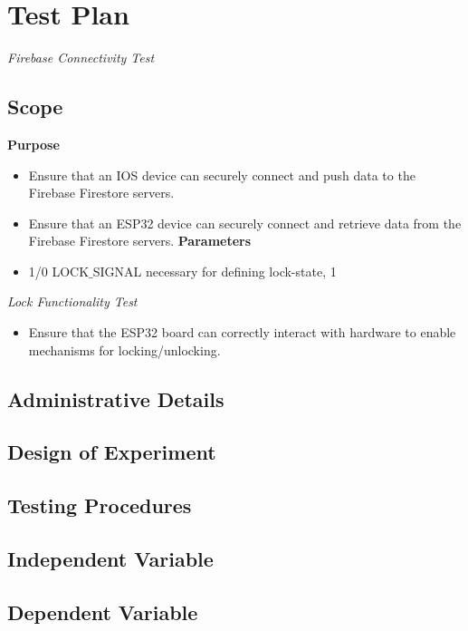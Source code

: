 \section{Test Plan}
\textit{Firebase Connectivity Test}
\newline
\subsection{Scope}
\textbf{Purpose}
\begin{itemize}
    \item Ensure that an IOS device can securely connect and push data to the Firebase Firestore servers.
    \item Ensure that an ESP32 device can securely connect and retrieve data from the Firebase Firestore servers.
\textbf{Parameters}
\item 1/0 LOCK$\_$SIGNAL necessary for defining lock-state, 1 
\end{itemize}
\textit{Lock Functionality Test}
\begin{itemize}
    \item Ensure that the ESP32 board can correctly interact with hardware to enable mechanisms for locking/unlocking.
\end{itemize}
\subsection{Administrative Details}

\subsection{Design of Experiment}

\subsection{Testing Procedures}

\subsection{Independent Variable}

\subsection{Dependent Variable}
